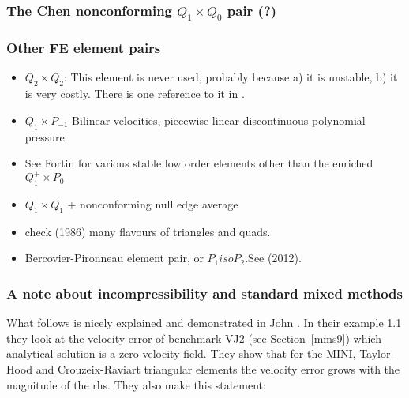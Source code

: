 \subsubsection{The Chen nonconforming $Q_1\times Q_0$ pair (?)} \label{ss:chenq0}



\subsubsection{Other FE element pairs}

\begin{itemize}

\item $Q_2\times Q_2$: This element is never used, probably because a) it is unstable, b) it is very costly. 
There is one reference to it in \cite{hufb86}.

\item $Q_1\times P_{-1}$ Bilinear velocities,  piecewise linear discontinuous polynomial pressure.

\item See Fortin \cite{fort81} for various stable low order elements other than the enriched $Q_1^+ \times P_0$

\item $Q_1\times Q_1$ + nonconforming null edge average \cite{fros07}

\item check \textcite{dhhu86} (1986) many flavours of triangles and quads.

\item Bercovier-Pironneau element pair, or $P_1isoP_2$.See \textcite{bocg12} (2012).

\end{itemize}

\subsubsection{A note about incompressibility and standard mixed methods}

What follows is nicely explained and demonstrated in John \etal \cite{jolm17}. In their 
example 1.1 they look at the velocity error of benchmark VJ2 (see Section~\ref{mms9}) 
which analytical solution is a zero velocity field. They show that for the MINI, 
Taylor-Hood and Crouzeix-Raviart triangular elements the velocity error grows 
with the magnitude of the rhs. They also make this statement:


